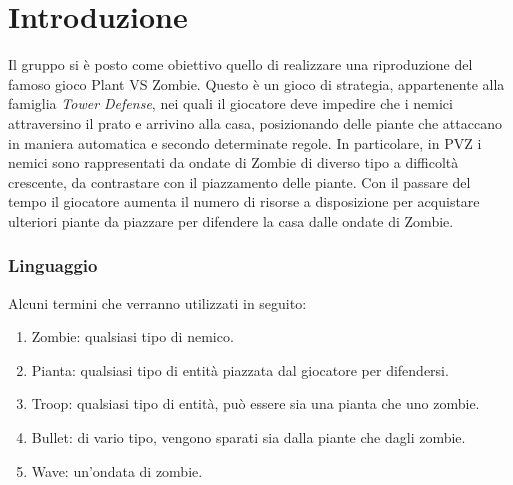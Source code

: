\section*{Introduzione}
Il gruppo si è posto come obiettivo quello di realizzare una riproduzione del famoso gioco Plant VS Zombie.
Questo è un gioco di strategia, appartenente alla famiglia \textit{Tower Defense}, nei quali il giocatore
deve impedire che  i nemici attraversino il prato e arrivino alla casa,
posizionando delle piante che attaccano in maniera automatica e secondo determinate regole.
In particolare, in PVZ i nemici sono rappresentati da ondate di Zombie di diverso tipo a difficoltà crescente,
da contrastare con il piazzamento delle piante.
Con il passare del tempo il giocatore aumenta il numero di risorse a disposizione per acquistare
ulteriori piante da piazzare per difendere la casa dalle ondate di Zombie.

\subsubsection{Linguaggio}
Alcuni termini che verranno utilizzati in seguito:
\begin{enumerate}
    \item Zombie: qualsiasi tipo di nemico.
    \item Pianta: qualsiasi tipo di entità piazzata dal giocatore per difendersi.
    \item Troop: qualsiasi tipo di entità, può essere sia una pianta che uno zombie.
    \item Bullet: di vario tipo, vengono sparati sia dalla piante che dagli zombie.
    \item Wave: un'ondata di zombie.
\end{enumerate}